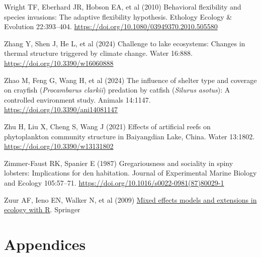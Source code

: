 \documentclass[
  12pt,
  a4paper,
  oneside]{scrbook}
\newlength{\cslhangindent}
\newenvironment{CSLReferences}[2] %
 {\begin{list}{}{%
  \setlength{\itemindent}{0pt}
  \setlength{\leftmargin}{0pt}
  \setlength{\parsep}{0pt}
  \ifodd #1
   \setlength{\leftmargin}{\cslhangindent}
   \setlength{\itemindent}{-1\cslhangindent}
  \fi
  \setlength{\itemsep}{#2\baselineskip}}}
 {\end{list}}
\begin{document}
\begin{CSLReferences}{1}{1}
Wright TF, Eberhard JR, Hobson EA, et al (2010) Behavioral flexibility
and species invasions: The adaptive flexibility hypothesis. Ethology
Ecology \& Evolution 22:393--404.
\url{https://doi.org/10.1080/03949370.2010.505580}

Zhang Y, Shen J, He L, et al (2024) Challenge to lake ecosystems:
Changes in thermal structure triggered by climate change. Water 16:888.
\url{https://doi.org/10.3390/w16060888}

Zhao M, Feng G, Wang H, et al (2024) The influence of shelter type and
coverage on crayfish ({\emph{Procambarus clarkii}}) predation by catfish
({\emph{Silurus asotus}}): A controlled environment study. Animals
14:1147. \url{https://doi.org/10.3390/ani14081147}

Zhu H, Liu X, Cheng S, Wang J (2021) Effects of artificial reefs on
phytoplankton community structure in {Baiyangdian Lake, China}. Water
13:1802. \url{https://doi.org/10.3390/w13131802}

Zimmer-Faust RK, Spanier E (1987) Gregariousness and sociality in spiny
lobsters: Implications for den habitation. Journal of Experimental
Marine Biology and Ecology 105:57--71.
\url{https://doi.org/10.1016/s0022-0981(87)80029-1}

Zuur AF, Ieno EN, Walker N, et al (2009)
\href{https://doi.org/10.1007/978-0-387-87458-6}{Mixed effects models
and extensions in ecology with {R}}. Springer

\end{CSLReferences}


\chapter*{Appendices}\label{appendices}



\backmatter
\end{document}
